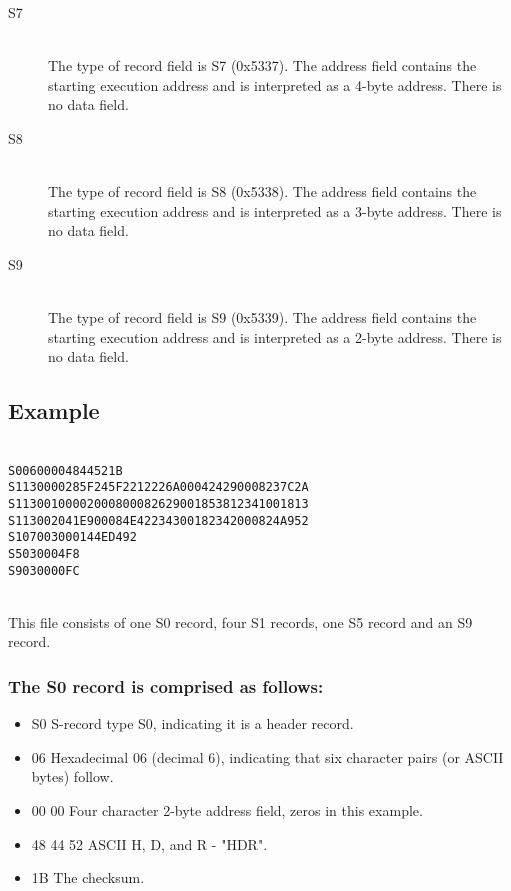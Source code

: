 \begin{description}
            \item[S7]~\\
                The type of record field is S7 (0x5337). The address field contains the starting execution address and is interpreted as a 4-byte address. There is no data field.

            \item[S8]~\\
                The type of record field is S8 (0x5338). The address field contains the starting execution address and is interpreted as a 3-byte address. There is no data field.

            \item[S9]~\\
                The type of record field is S9 (0x5339). The address field contains the starting execution address and is interpreted as a 2-byte address. There is no data field.
        \end{description}

    \subsection{Example}
        ~\\
        \verb'S00600004844521B'\\
        \verb'S1130000285F245F2212226A000424290008237C2A'\\
        \verb'S11300100002000800082629001853812341001813'\\
        \verb'S113002041E900084E42234300182342000824A952'\\
        \verb'S107003000144ED492'\\
        \verb'S5030004F8'\\
        \verb'S9030000FC'

        ~\\This file consists of one S0 record, four S1 records, one S5 record and an S9 record.

    \subsubsection{The S0 record is comprised as follows:}
        \begin{itemize}
            \item S0 S-record type S0, indicating it is a header record.
            \item 06 Hexadecimal 06 (decimal 6), indicating that six character pairs (or ASCII bytes) follow.
            \item 00 00 Four character 2-byte address field, zeros in this example.
            \item 48 44 52 ASCII H, D, and R - "HDR".
            \item 1B The checksum.
        \end{itemize}

